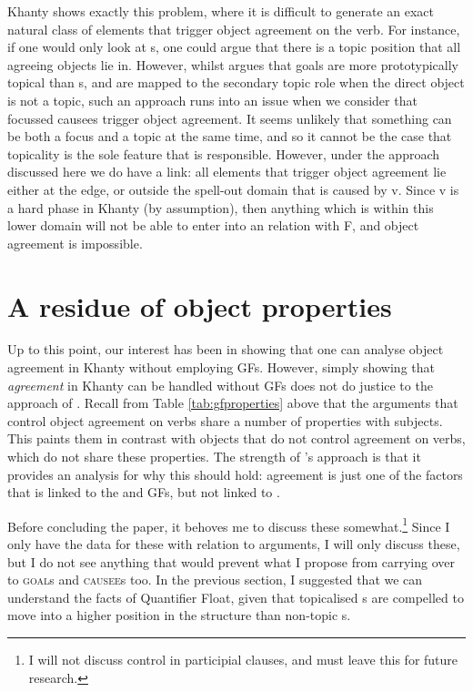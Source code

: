 \documentclass[output=paper
,modfonts
,nonflat]{langsci/langscibook}
\begin{document}
Khanty shows exactly this problem, where it is difficult to generate an exact natural class of elements that trigger object agreement on the verb. 
For instance, if one would only look at \theme s, one could argue that there is a topic position that all agreeing objects lie in.
However, whilst \citet{nikolaeva2001} argues that goals are more prototypically topical than \theme s, and are mapped to the secondary topic role when the direct object is not a topic, such an approach runs into an issue when we consider that focussed causees trigger object agreement.
It seems unlikely that something can be both a focus and a topic at the same time, and so it cannot be the case that topicality is the sole feature that is responsible.
However, under the approach discussed here we do have a link: all elements that trigger object agreement lie either at the edge, or outside the spell-out domain that is caused by v. 
Since v is a hard phase in Khanty (by assumption), then anything which is within this lower domain will not be able to enter into an \agree{} relation with F, and object agreement is impossible.

\section{A residue of object properties}\label{residue}

Up to this point, our interest has been in showing that one can analyse object agreement in Khanty without employing GFs. 
However, simply showing that \emph{agreement} in Khanty can be handled without GFs does not do justice to the approach of \citet{dn2011}.
Recall from Table \ref{tab:gfproperties} above that the arguments that control object agreement on verbs share a number of properties with subjects. 
This paints them in contrast with objects that do not control agreement on verbs, which do not share these properties. 
The strength of \citeauthor{dn2011}'s approach is that it provides an analysis for why this should hold: agreement is just one of the factors that is linked to the \subj{} and \object{} GFs, but not linked to \robj.

Before concluding the paper, it behoves me to discuss these somewhat.\footnote{I will not discuss control in participial clauses, and must leave this for future research.} 
Since I only have the data for these with relation to \theme{} arguments, I will only discuss these, but I do not see anything that would prevent what I propose from carrying over to \textsc{goal}s and \textsc{causee}s too.
In the previous section, I suggested that we can understand the facts of Quantifier Float, given that topicalised \theme s are compelled to move into a higher position in the structure than non-topic \theme s.
\end{document}

